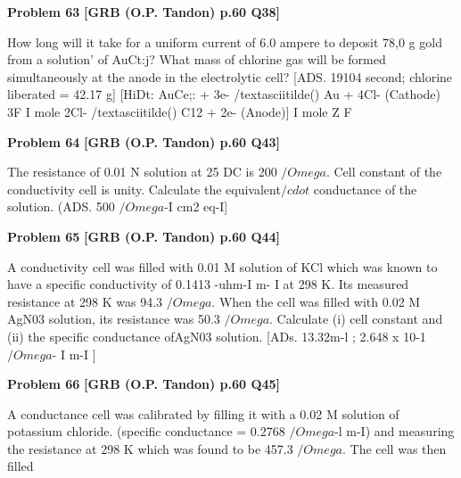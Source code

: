 \begin{problembox}
\textbf{Problem 63} \hfill \textbf{[GRB (O.P. Tandon) p.60 Q38]}
\label{q:ext-grb_all_questions-63}

How long will it take for a uniform current of 6.0 ampere to 
deposit 78,0 g gold from a solution' of AuCt:j? What mass of 
chlorine gas will be formed simultaneously at the anode in the 
electrolytic cell? 
[ADS. 
19104 second; chlorine liberated = 42.17 g] 
[HiDt: 
AuCe;: + 3e- /textasciitilde() 
Au 
+ 4Cl- (Cathode) 
3F 
I mole 
2Cl- /textasciitilde() 
C12 
+ 2e- (Anode)] 
I mole 
Z F
\end{problembox}

\begin{problembox}
\textbf{Problem 64} \hfill \textbf{[GRB (O.P. Tandon) p.60 Q43]}
\label{q:ext-grb_all_questions-64}

The resistance of 0.01 N solution at 25
DC is 200 $/Omega$. Cell 
constant of the conductivity cell is unity. Calculate the 
equivalent$/cdot$ conductance of the solution. 
(ADS. 
500 $/Omega$-I cm2 eq-I]
\end{problembox}

\begin{problembox}
\textbf{Problem 65} \hfill \textbf{[GRB (O.P. Tandon) p.60 Q44]}
\label{q:ext-grb_all_questions-65}

A conductivity cell was filled with 0.01 M solution of KCl 
which was known to have a specific conductivity of 0.1413 
-uhm-I m- I at 298 K. Its measured resistance at 298 K was 
94.3 $/Omega$. When the cell was filled with 0.02 M AgN03 
solution, its resistance was 50.3 $/Omega$. Calculate (i) cell 
constant and (ii) the specific conductance ofAgN03 solution. 
[ADs. 
13.32m-l ; 2.648 x 10-1 $/Omega$- I m-I ]
\end{problembox}

\begin{problembox}
\textbf{Problem 66} \hfill \textbf{[GRB (O.P. Tandon) p.60 Q45]}
\label{q:ext-grb_all_questions-66}

A conductance cell was calibrated by filling it with a 0.02 M 
solution of potassium chloride. (specific 
conductance 
= 0.2768 $/Omega$-l m-I) and measuring the resistance at 298 K 
which was found to be 457.3 $/Omega$. The cell was then filled
\end{problembox}


